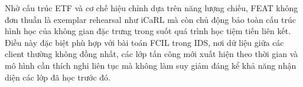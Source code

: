 
Nhờ cấu trúc ETF và cơ chế hiệu chỉnh dựa trên năng lượng chiếu, FEAT không đơn thuần là exemplar rehearsal như iCaRL mà còn chủ động bảo toàn cấu trúc hình học của không gian đặc trưng trong suốt quá trình học tiệm tiến liên kết. Điều này đặc biệt phù hợp với bài toán FCIL trong IDS, nơi dữ liệu giữa các client thường không đồng nhất, các lớp tấn công mới xuất hiện theo thời gian và mô hình cần thích nghi liên tục mà không làm suy giảm đáng kể khả năng nhận diện các lớp đã học trước đó.

